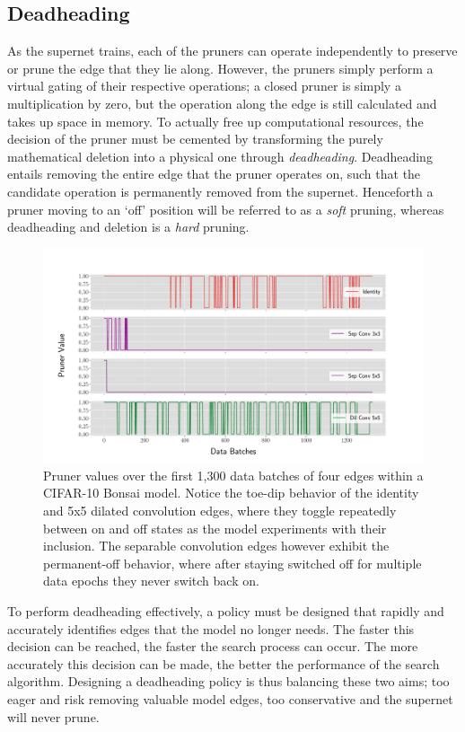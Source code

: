 \subsection{Deadheading}
As the supernet trains, each of the pruners can operate independently to preserve or prune the edge that they
lie along. However, the pruners simply perform a virtual gating of their respective operations; a closed pruner is simply a multiplication by zero, but the operation along the
edge is still calculated and takes up space in memory. To actually free up computational resources, the decision of the
pruner must be cemented by transforming the purely mathematical deletion into a physical one through \textit{deadheading}.
Deadheading entails removing the entire edge that the pruner operates on, such that the
candidate operation is permanently removed from the supernet. Henceforth a pruner moving to an `off' position
will be referred to as a \textit{soft} pruning, whereas deadheading and deletion is a \textit{hard} pruning.

\begin{figure}[ht!]
	\centering
	\includegraphics[width=\textwidth]{pruner_history}
	\caption[Pruner values of different operations over time in a CIFAR-10 BonsaiNet model]{Pruner values over the first 1,300 data batches of four edges within a CIFAR-10 Bonsai model. Notice
	 the toe-dip behavior of the identity and 5x5 dilated convolution edges, where they toggle repeatedly between on
	and off states as the model experiments with their inclusion. The separable convolution edges however exhibit the
	permanent-off behavior, where after staying switched off for multiple data epochs they never switch back on.}
	\label{fig:prunerhist}
\end{figure}

To perform deadheading effectively, a policy must be designed that rapidly and accurately identifies edges that the model
no longer needs. The faster this decision can be reached, the faster
the search process can occur. The more accurately this decision can be made, the better the performance of the search
algorithm. Designing a deadheading policy is thus balancing these two aims; too eager and risk removing valuable model
edges, too conservative and the supernet will never prune.

